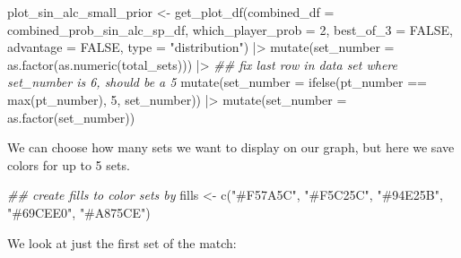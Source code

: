 \documentclass[
  letterpaper,
  DIV=11,
  numbers=noendperiod]{scrartcl}
\newenvironment{Shaded}{\begin{snugshade}}{\end{snugshade}}
\newcommand{\AttributeTok}[1]{\textcolor[rgb]{0.40,0.45,0.13}{#1}}
\newcommand{\ConstantTok}[1]{\textcolor[rgb]{0.56,0.35,0.01}{#1}}
\newcommand{\DecValTok}[1]{\textcolor[rgb]{0.68,0.00,0.00}{#1}}
\newcommand{\DocumentationTok}[1]{\textcolor[rgb]{0.37,0.37,0.37}{\textit{#1}}}
\newcommand{\FunctionTok}[1]{\textcolor[rgb]{0.28,0.35,0.67}{#1}}
\newcommand{\NormalTok}[1]{\textcolor[rgb]{0.00,0.23,0.31}{#1}}
\newcommand{\OtherTok}[1]{\textcolor[rgb]{0.00,0.23,0.31}{#1}}
\newcommand{\SpecialCharTok}[1]{\textcolor[rgb]{0.37,0.37,0.37}{#1}}
\newcommand{\StringTok}[1]{\textcolor[rgb]{0.13,0.47,0.30}{#1}}
\begin{document}
\begin{Shaded}
\begin{Highlighting}[]
\NormalTok{plot\_sin\_alc\_small\_prior }\OtherTok{\textless{}{-}} \FunctionTok{get\_plot\_df}\NormalTok{(}\AttributeTok{combined\_df =}\NormalTok{ combined\_prob\_sin\_alc\_sp\_df, }
                        \AttributeTok{which\_player\_prob =} \DecValTok{2}\NormalTok{,}
                        \AttributeTok{best\_of\_3 =} \ConstantTok{FALSE}\NormalTok{,}
                        \AttributeTok{advantage =} \ConstantTok{FALSE}\NormalTok{,}
                        \AttributeTok{type =} \StringTok{"distribution"}\NormalTok{) }\SpecialCharTok{|\textgreater{}}
  \FunctionTok{mutate}\NormalTok{(}\AttributeTok{set\_number =} \FunctionTok{as.factor}\NormalTok{(}\FunctionTok{as.numeric}\NormalTok{(total\_sets))) }\SpecialCharTok{|\textgreater{}}
  \DocumentationTok{\#\# fix last row in data set where set\_number is 6, should be a 5}
  \FunctionTok{mutate}\NormalTok{(}\AttributeTok{set\_number =} \FunctionTok{ifelse}\NormalTok{(pt\_number }\SpecialCharTok{==} \FunctionTok{max}\NormalTok{(pt\_number), }\StringTok{\textquotesingle{}5\textquotesingle{}}\NormalTok{, set\_number)) }\SpecialCharTok{|\textgreater{}}
  \FunctionTok{mutate}\NormalTok{(}\AttributeTok{set\_number =} \FunctionTok{as.factor}\NormalTok{(set\_number))}
\end{Highlighting}
\end{Shaded}

\linespread{2}

We can choose how many sets we want to display on our graph, but here we
save colors for up to 5 sets.

\linespread{0.9}

\begin{Shaded}
\begin{Highlighting}[]
\DocumentationTok{\#\# create fills to color sets by}
\NormalTok{fills }\OtherTok{\textless{}{-}} \FunctionTok{c}\NormalTok{(}\StringTok{"\#F57A5C"}\NormalTok{, }\StringTok{"\#F5C25C"}\NormalTok{, }\StringTok{"\#94E25B"}\NormalTok{, }\StringTok{"\#69CEE0"}\NormalTok{, }\StringTok{"\#A875CE"}\NormalTok{)}
\end{Highlighting}
\end{Shaded}

\linespread{2}

We look at just the first set of the match:

\linespread{0.9}
\end{document}
